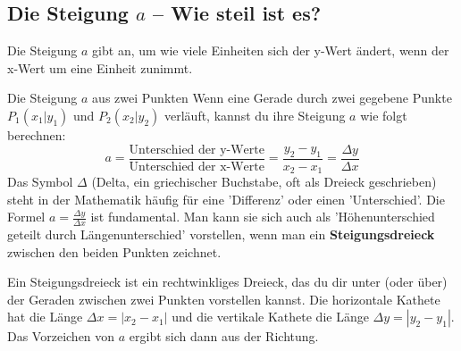 \subsection{Die Steigung $a$ – Wie steil ist es?}

Die Steigung $a$ gibt an, um wie viele Einheiten sich der y-Wert ändert, wenn der x-Wert um eine Einheit zunimmt.

\begin{merksatzumgebung}{Die Steigung $a$ aus zwei Punkten}
Wenn eine Gerade durch zwei gegebene Punkte $P_1(x_1|y_1)$ und $P_2(x_2|y_2)$ verläuft, kannst du ihre Steigung $a$ wie folgt berechnen:
\[ a = \frac{\text{Unterschied der y-Werte}}{\text{Unterschied der x-Werte}} = \frac{y_2 - y_1}{x_2 - x_1} = \frac{\Delta y}{\Delta x} \]
Das Symbol $\Delta$ (Delta, ein griechischer Buchstabe, oft als Dreieck geschrieben) steht in der Mathematik häufig für eine 'Differenz' oder einen 'Unterschied'.
Die Formel $a = \frac{\Delta y}{\Delta x}$ ist fundamental. Man kann sie sich auch als 'Höhenunterschied geteilt durch Längenunterschied' vorstellen, wenn man ein \textbf{Steigungsdreieck} zwischen den beiden Punkten zeichnet.
\end{merksatzumgebung}

Ein Steigungsdreieck ist ein rechtwinkliges Dreieck, das du dir unter (oder über) der Geraden zwischen zwei Punkten vorstellen kannst. Die horizontale Kathete hat die Länge $\Delta x = |x_2-x_1|$ und die vertikale Kathete die Länge $\Delta y = |y_2-y_1|$. Das Vorzeichen von $a$ ergibt sich dann aus der Richtung.


